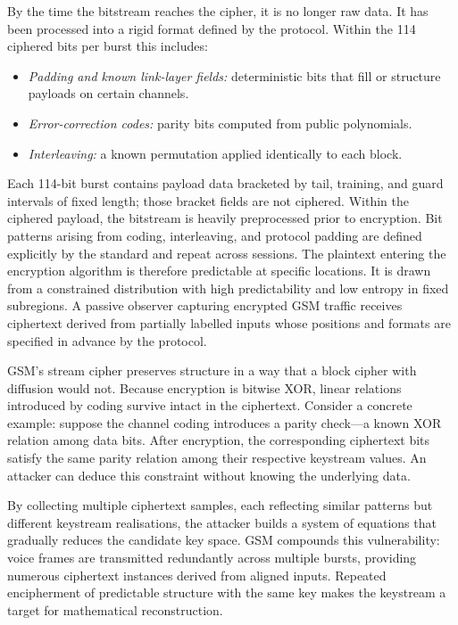 By the time the bitstream reaches the cipher, it is no longer raw data. It has been processed into a rigid format defined by the protocol. Within the 114 ciphered bits per burst this includes:

\begin{itemize}
  \item \textit{Padding and known link-layer fields:} deterministic bits that fill or structure payloads on certain channels.
  \item \textit{Error-correction codes:} parity bits computed from public polynomials.
  \item \textit{Interleaving:} a known permutation applied identically to each block.
\end{itemize}

Each 114-bit burst contains payload data bracketed by tail, training, and guard intervals of fixed length; those bracket fields are not ciphered. Within the ciphered payload, the bitstream is heavily preprocessed prior to encryption. Bit patterns arising from coding, interleaving, and protocol padding are defined explicitly by the standard and repeat across sessions. The plaintext entering the encryption algorithm is therefore predictable at specific locations. It is drawn from a constrained distribution with high predictability and low entropy in fixed subregions. A passive observer capturing encrypted GSM traffic receives ciphertext derived from partially labelled inputs whose positions and formats are specified in advance by the protocol.

GSM's stream cipher preserves structure in a way that a block cipher with diffusion would not. Because encryption is bitwise XOR, linear relations introduced by coding survive intact in the ciphertext. Consider a concrete example: suppose the channel coding introduces a parity check—a known XOR relation among data bits. After encryption, the corresponding ciphertext bits satisfy the same parity relation among their respective keystream values. An attacker can deduce this constraint without knowing the underlying data.

By collecting multiple ciphertext samples, each reflecting similar patterns but different keystream realisations, the attacker builds a system of equations that gradually reduces the candidate key space. GSM compounds this vulnerability: voice frames are transmitted redundantly across multiple bursts, providing numerous ciphertext instances derived from aligned inputs. Repeated encipherment of predictable structure with the same key makes the keystream a target for mathematical reconstruction.

